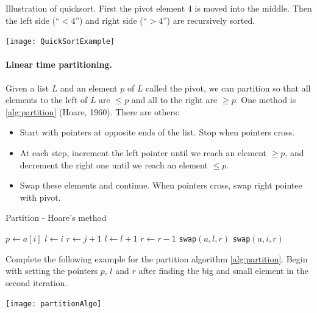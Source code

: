 \begin{Example}
Illustration of quicksort. First the pivot element 4 is moved into the middle. 
Then the left side (``$< 4$'') and right side (``$> 4$'') are recursively sorted.
\begin{center}
  \texttt{[image: QuickSortExample]}
\end{center}
\end{Example}


\paragraph{Linear time partitioning.}
Given a list $L$ and an element $p$ of $L$ called the pivot, we can partition so
 that all elements to the left of $L$ are $\leq p$ and all to the right are 
$\geq p$. One method is \cref{alg:partition} (Hoare, 1960). There are others:
\begin{itemize}
\item Start with pointers at opposite ends of the list. Stop when pointers cross.
\item At each step, increment the left pointer until we reach an element $\geq p$, and decrement the right one until we reach an element $\leq p$. 
\item Swap these elements and continue. When pointers cross, swap right pointee with pivot.
\end{itemize}

\begin{algorithm}[H]
  \caption{Partition - Hoare's method}
    \label{alg:partition}
\begin{algorithmic}[0]
\State $p \gets a[i]$ 
\State $l \gets i $ 
\State $r \gets j+1$ 
\Repeat
\State $l\gets l+1 $ 
\Repeat
\State $r \gets r-1 $ 
\State \texttt{swap}$(a,l,r)$  
\Else
\State \texttt{swap}$(a,i,r)$  
\State {}
\EndIf
\EndWhile
\EndFunction  
\end{algorithmic}
\end{algorithm}

\begin{Boxample}[1]
Complete the following example for the partition algorithm \cref{alg:partition}. 
Begin with setting the pointers $p$, $l$ and $r$ after finding the big and small element in the second iteration.
\begin{center}
\texttt{[image: partitionAlgo]}
\end{center}
\end{Boxample}

